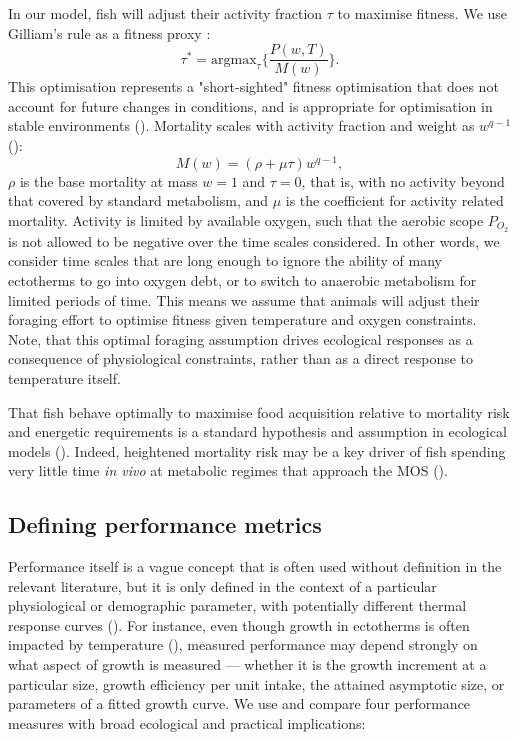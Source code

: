 \documentclass[11pt]{article}\usepackage[]{graphicx}\usepackage[]{color,soul}
\begin{document}
In our model, fish will adjust their activity fraction $\tau$ to maximise fitness. We use Gilliam's rule as a fitness proxy \citealt{gilliam_habitat_1987}:
\begin{equation}
  \tau^* = \text{argmax}_{\tau} \{ \frac{P(w,T)}{M(w)} \}.
\end{equation}
This optimisation represents a "short-sighted" fitness optimisation that does not account for future changes in conditions, and is appropriate for optimisation in stable environments (\citealt{sainmont_effective_2015}).  Mortality scales with activity fraction and weight as $w^{q-1}$ (\citealt{andersen_how_2009, hartvig_food_2011}):
\begin{equation}
  \label{eq:M}
  M(w) = (\rho+\mu\tau) w^{q-1},
\end{equation}
$\rho$ is the base mortality at mass $w=1$ and $\tau=0$, that is, with no activity beyond that covered by standard metabolism, and $\mu$ is the coefficient for activity related mortality.  Activity is limited by available oxygen, such that the aerobic scope $P_{O_2}$ is not allowed to be negative over the time scales considered. In other words, we consider time scales that are long enough to ignore the ability of many ectotherms to go into oxygen debt, or to switch to anaerobic metabolism for limited periods of time. This means we assume that animals will adjust their foraging effort to optimise fitness given temperature and oxygen constraints. Note, that this optimal foraging assumption drives ecological responses as a consequence of physiological constraints, rather than as a direct response to temperature itself.

That fish behave optimally to maximise food acquisition relative to mortality risk and energetic requirements is a standard hypothesis and assumption in ecological models (\citealt{gilliam_habitat_1987,sainmont_effective_2015,priede_natural_1977, claireaux_influence_2000,hufnagl_physiological_2011}). Indeed, heightened mortality risk may be a key driver of fish spending very little time \emph{in vivo} at metabolic regimes that approach the MOS (\citealt{priede_natural_1977}). 


\subsection*{Defining performance metrics}

Performance itself is a vague concept that is often used without definition in the relevant literature, but it is only defined in the context of a particular physiological or demographic parameter, with potentially different thermal response curves (\citealt{jutfelt_oxygen-and_2018}). For instance, even though growth in ectotherms is often impacted by temperature (\citealt{angilletta_temperature_2004}), measured performance may depend strongly on what aspect of growth is measured --- whether it is the growth increment at a particular size, growth efficiency per unit intake, the attained asymptotic size, or parameters of a fitted growth curve. We use and compare four performance measures with broad ecological and practical implications:
\end{document}
